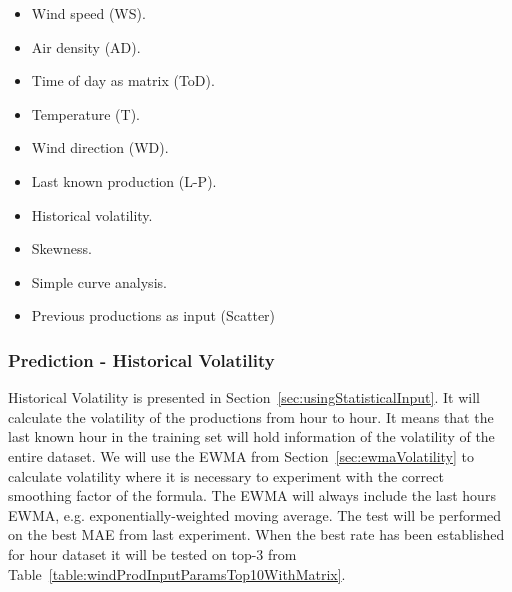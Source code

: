\begin{itemize}
\item Wind speed (WS).
\item Air density (AD).
\item Time of day as matrix (ToD).
\item Temperature (T).
\item Wind direction (WD).
\item Last known production (L-P).
\item Historical volatility.
\item Skewness.
\item Simple curve analysis.
\item Previous productions as input (Scatter)
\end{itemize}

\subsubsection{Prediction - Historical Volatility}
Historical Volatility is presented in Section~\ref{sec:usingStatisticalInput}. It will calculate the volatility of the productions from hour to hour. It means that the last known hour in the training set will hold information of the volatility of the entire dataset. We will use the EWMA from Section~\ref{sec:ewmaVolatility} to calculate volatility where it is necessary to experiment with the correct smoothing factor of the formula. The EWMA will always include the last hours EWMA, e.g. exponentially-weighted moving average. The test will be performed on the best MAE from last experiment. When the best rate has been established for hour dataset it will be tested on top-3 from Table~\ref{table:windProdInputParamsTop10WithMatrix}.

